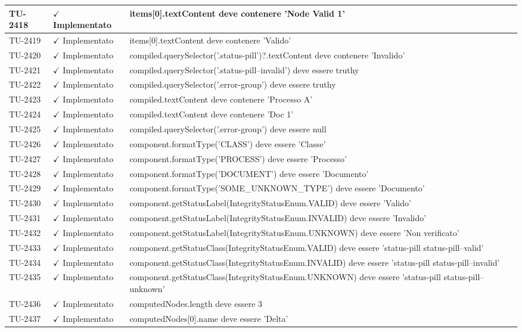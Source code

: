 ﻿\documentclass[a4paper,12pt]{article}
\newcommand{\ok}{\textcolor{green!60!black}{$\checkmark$ Implementato}}
\begin{document}
\begin{longtable}{|p{2cm}|p{3.5cm}|p{9.5cm}|}
\hline
TU-2418 & \ok & items[0].textContent deve contenere 'Node Valid 1' \\
\hline
TU-2419 & \ok & items[0].textContent deve contenere 'Valido' \\
\hline
TU-2420 & \ok & compiled.querySelector('.status-pill')?.textContent deve contenere 'Invalido' \\
\hline
TU-2421 & \ok & compiled.querySelector('.status-pill--invalid') deve essere truthy \\
\hline
TU-2422 & \ok & compiled.querySelector('.error-group') deve essere truthy \\
\hline
TU-2423 & \ok & compiled.textContent deve contenere 'Processo A' \\
\hline
TU-2424 & \ok & compiled.textContent deve contenere 'Doc 1' \\
\hline
TU-2425 & \ok & compiled.querySelector('.error-group') deve essere null \\
\hline
TU-2426 & \ok & component.formatType('CLASS') deve essere 'Classe' \\
\hline
TU-2427 & \ok & component.formatType('PROCESS') deve essere 'Processo' \\
\hline
TU-2428 & \ok & component.formatType('DOCUMENT') deve essere 'Documento' \\
\hline
TU-2429 & \ok & component.formatType('SOME\_UNKNOWN\_TYPE') deve essere 'Documento' \\
\hline
TU-2430 & \ok & component.getStatusLabel(IntegrityStatusEnum.VALID) deve essere 'Valido' \\
\hline
TU-2431 & \ok & component.getStatusLabel(IntegrityStatusEnum.INVALID) deve essere 'Invalido' \\
\hline
TU-2432 & \ok & component.getStatusLabel(IntegrityStatusEnum.UNKNOWN) deve essere 'Non verificato' \\
\hline
TU-2433 & \ok & component.getStatusClass(IntegrityStatusEnum.VALID) deve essere 'status-pill status-pill--valid' \\
\hline
TU-2434 & \ok & component.getStatusClass(IntegrityStatusEnum.INVALID) deve essere 'status-pill status-pill--invalid' \\
\hline
TU-2435 & \ok & component.getStatusClass(IntegrityStatusEnum.UNKNOWN) deve essere 'status-pill status-pill--unknown' \\
\hline
TU-2436 & \ok & computedNodes.length deve essere 3 \\
\hline
TU-2437 & \ok & computedNodes[0].name deve essere 'Delta' \\

\end{longtable}
\end{document}
